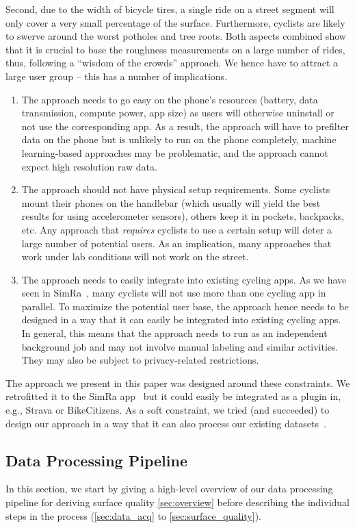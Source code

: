 Second, due to the width of bicycle tires, a single ride on a street segment will only cover a very small percentage of the surface.
Furthermore, cyclists are likely to swerve around the worst potholes and tree roots.
Both aspects combined show that it is crucial to base the roughness measurements on a large number of rides, thus, following a ``wisdom of the crowds'' approach.
We hence have to attract a large user group -- this has a number of implications.
\begin{enumerate}
	\item The approach needs to go easy on the phone's resources (battery, data transmission, compute power, app size) as users will otherwise uninstall or not use the corresponding app. As a result, the approach will have to prefilter data on the phone but is unlikely to run on the phone completely, machine learning-based approaches may be problematic, and the approach cannot expect high resolution raw data.
	\item The approach should not have physical setup requirements. Some cyclists mount their phones on the handlebar (which usually will yield the best results for using accelerometer sensors), others keep it in pockets, backpacks, etc. Any approach that \emph{requires} cyclists to use a certain setup will deter a large number of potential users. As an implication, many approaches that work under lab conditions will not work on the street.
	\item The approach needs to easily integrate into existing cycling apps. As we have seen in SimRa~\cite{karakaya2020simra}, many cyclists will not use more than one cycling app in parallel. To maximize the potential user base, the approach hence needs to be designed in a way that it can easily be integrated into existing cycling apps. In general, this means that the approach needs to run as an independent background job and may not involve manual labeling and similar activities. They may also be subject to privacy-related restrictions.
\end{enumerate}

The approach we present in this paper was designed around these constraints.
We retrofitted it to the SimRa app~\cite{karakaya2020simra} but it could easily be integrated as a plugin in, e.g., Strava or BikeCitizens.
As a soft constraint, we tried (and succeeded) to design our approach in a way that it can also process our existing datasets~\cite{dataset_simra_set1,dataset_simra_set2,dataset_simra_set3}.


\subsection{Data Processing Pipeline}
\label{subsec:data_processing_pipeline}
In this section, we start by giving a high-level overview of our data processing pipeline for deriving surface quality \cref{sec:overview} before describing the individual steps in the process (\cref{sec:data_acq} to \cref{sec:surface_quality}).


